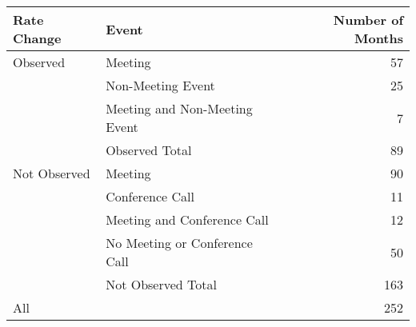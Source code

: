 \begin{tabular}{llr}
\toprule
  Rate Change &                          Event &  Number of Months \\
\midrule
     Observed &                        Meeting &                57 \\
              &              Non-Meeting Event &                25 \\
              &  Meeting and Non-Meeting Event &                 7 \\
              &                 Observed Total &                89 \\
 \hline Not Observed &                        Meeting &                90 \\
              &                Conference Call &                11 \\
              &    Meeting and Conference Call &                12 \\
              &  No Meeting or Conference Call &                50 \\
              &             Not Observed Total &               163 \\
          \hline\hline All &                                &               252 \\
\bottomrule
\end{tabular}
